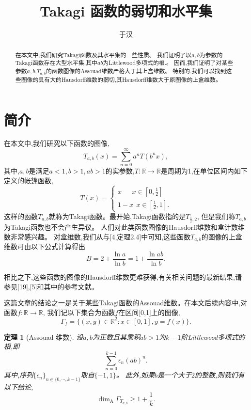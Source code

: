 \documentclass[12pt,a4paper]{article}
\title{Takagi 函数的弱切和水平集}
\author{于汉}
\date{}
\newtheorem{theorem}{定理}[section]
\newcommand{\Adim}{\mathrm{\dim_A}}
\begin{document}
      \maketitle
      
      \begin{abstract}
            在本文中,我们研究Takagi函数及其水平集的一些性质。
            我们证明了以$a,b$为参数的Takagi函数存在大型水平集,其中$ab$为Littlewood多项式的根.。
            因而,我们证明了对某些参数$a,b$,$T_{a,b}$的函数图像的Assouad维数严格大于其上盒维数。
            特别的,我们可以找到这些图像的具有大的Hausdorff维数的弱切,其Hausdorff维数大于原图像的上盒维数。

      \end{abstract}

      \section{简介}
      在本文中,我们研究以下函数的图像,
      $$
            T_{a,b}(x)=\sum_{n=0}^\infty a^nT(b^nx),
      $$
      其中,$a,b$是满足$a<1,b>1,ab>1$的实参数,$T:\mathbb{R}\rightarrow\mathbb{R}$是周期为1,在单位区间内如下定义的帐篷函数,
      $$
            T(x)=\begin{cases}x~~~~~~~x\in[0,\frac{1}{2}] \\ 1-x~~x\in[\frac{1}{2},1].\end{cases}
      $$
      这样的函数$T_{a,b}$就称为Takagi函数。最开始,Takagi函数指的是$T_{\frac{1}{2},2}$,
      但是我们称$T_{a,b}$为Takagi函数也不会产生异议。
      人们对此类函数图像的Hausdorff维数和盒计数维数非常感兴趣。
      对盒维数,我们从\cite[第2章]{1}与[4,定理2.4]中可知,这些函数$T_{a,b}$的图像的上盒维数可由以下公式计算得出
      $$
            B = 2 + \frac{\ln a}{\ln b} = 1 + \frac{\ln ab}{\ln b}.
      $$

      相比之下,这些函数的图像的Hausdorff维数更难获得,有关相关问题的最新结果,请参见[19],[5]和其中的参考文献。

      这篇文章的结论之一是关于某些Takagi函数的Assouad维数。在本文后续内容中,对函数$f:\mathbb{R}\rightarrow\mathbb{R}$,
      我们记以下集合为函数$f$在区间[0,1]上的图像,
      $$
            \Gamma_f=\{(x,y)\in\mathbb{R}^2:x\in[0,1],y=f(x)\}.
      $$

      \begin{theorem}[Assouad 维数]
             设$a,b$为正数且其乘积$ab>1$为$k-1$阶Littlewood多项式的根,即
            $$
                  \sum_{n=0}^{k-1}\epsilon_n(ab)^n.
            $$
            其中,序列$\{\epsilon_n\}_{n\in\{0,\cdots,k-1\}}$取自$\{-1,1\}$。
            此外,如果$b$是一个大于$2$的整数,则我们有以下结论,
            $$
                  \Adim\Gamma_{T_{a,b}}\ge1+\frac{1}{k}.
            $$
      \end{theorem}
\end{document}
